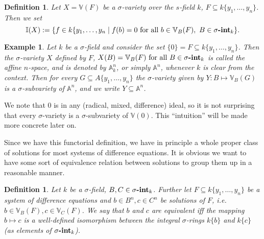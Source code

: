 \documentclass{article}
\def\I{\mathbb{I}}
\def\VV{\mathbb{V}}
\def\s{\sigma}
\def\fa{\text{ for all }}
\newcommand{\catname}[1]{{\normalfont\textbf{#1}}}
\newcommand{\sintk}{\s\text{\catname{-int}}_k}
\theoremstyle{plain}
\newtheorem{ex}[Satz]{Example}
\newtheorem{lem}[Satz]{Lemma}
\newtheorem{defn}[Satz]{Definition}
\theoremstyle{definition}
\begin{document}
\begin{defn}\label{defnI}
Let $X = \VV(F)$ be a $\s$-variety over the $s$-field $k$, $F \subseteq k\{y_1,\ldots,y_n\}$. Then we set $$\I(X):= \{ f \in k\{y_1,\ldots,y_n \mid f(b) = 0 \fa b \in \VV_B(F), ~ B \in \sintk \}.$$ \index{ $\I(X)$}
\end{defn}

\begin{ex}\label{A^n}
Let $k$ be a $\s$-field and consider the set $\{ 0 \} = F \subseteq k\{y_1,\ldots,y_n\}$. Then the $\s$-variety $X$ defined by $F$, $X(B) = \VV_B(F) \fa B \in \sintk$ is called the affine $n$-space, and is denoted by $\mathbb{A}^n_k$, 
or simply $\mathbb{A}^n$, whenever $k$ is clear from the context. Then for every $G \subseteq A\{y_1,\ldots,y_n\}$ the $\s$-variety given by $Y: B \mapsto \VV_B(G)$ is a $\s$-subvariety of $\mathbb{A}^n$, 
and we write $Y \subseteq \mathbb{A}^n$.
\end{ex}

We note that $0$ is in any (radical, mixed, difference) ideal, so it is not surprising that every $\s$-variety is a $\s$-subvariety of $\VV(0)$. This ``intuition'' will be made more concrete later on.

Since we have this functorial definition, we have in principle a whole proper class of solutions for most systems of difference equations. 
It is obvious we want to have some sort of equivalence relation between solutions to group them up in a reasonable manner.

\begin{defn}\label{equivsols}
Let $k$ be a $\s$-field, $B,C \in \sintk$. Further let $F \subseteq k\{y_1,\ldots,y_n\}$ be a system of difference equations and $b \in B^n, c \in C^n$ be solutions of $F$, i.e. $b \in \VV_B(F), c \in \VV_C(F)$.
We say that $b$ and $c$ are equivalent iff the mapping $b \mapsto c$ is a well-defined isomorphism between the integral $\s$-rings $k\{b\}$ and $k\{c\}$  (as elements of $\sintk$). 
\end{defn}

\end{document}
